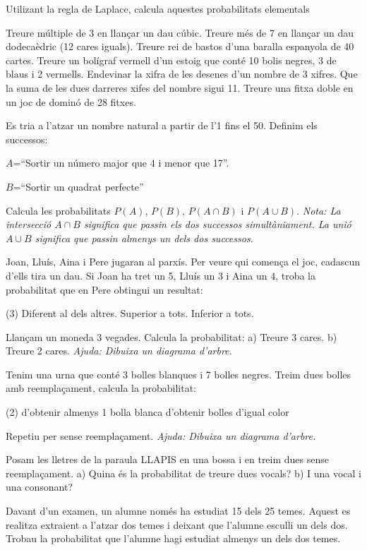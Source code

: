 \documentclass[11pt, a4paper, pdf]{article}
\begin{document}
\begin{mylist}
 
 \item Utilizant la regla de Laplace, calcula aquestes probabilitats elementals
 \begin{tasks}
 	\task Treure múltiple de 3 en llançar un dau cúbic.
 	\task Treure més de 7 en llançar un dau dodecaèdric (12 cares iguals).
 	\task Treure rei de bastos d'una baralla espanyola de 40 cartes.
 	\task Treure un bolígraf vermell d'un estoig que conté 10 bolis negres, 3 de blaus i 2 vermells.
 	\task Endevinar la xifra de les desenes d'un nombre de 3 xifres.
	\task Que la suma de les dues darreres xifes del nombre sigui 11.
 	\task Treure una fitxa doble en un joc de dominó de 28 fitxes.
 \end{tasks}

\item Es tria a l'atzar un nombre natural a partir de l'1 fins el 50. Definim els successos:

\quad $A$=``Sortir un número major que 4 i menor que 17''.

\quad $B$=``Sortir un quadrat perfecte''

Calcula les probabilitats $P(A)$, $P(B)$, $P(A\cap B)$ i $P(A\cup B)$. \textit{Nota:  La intersecció $A\cap B$ significa que passin els dos successos simultàniament. La unió $A\cup B$ significa que passin almenys un dels dos successos.}

\item 
Joan, Lluís, Aina i Pere jugaran al parxís. Per veure qui comença el joc, cadascun
d'ells tira un dau. Si Joan ha tret un 5, Lluís un 3 i Aina un 4, troba la probabilitat que en Pere obtingui un resultat:
\begin{tasks}(3)
\task Diferent al dels altres. \task Superior a tots. \task Inferior a tots.
\end{tasks}

\item Llançam un moneda 3 vegades. Calcula la probabilitat:
	a) Treure 3 cares.
	b) Treure 2 cares.
 \textit{Ajuda: Dibuixa un diagrama d'arbre.}

\item Tenim una urna que conté 3 bolles blanques i 7 bolles negres. Treim dues bolles amb reemplaçament, calcula la probabilitat:
\begin{tasks}(2)
	\task d'obtenir almenys 1 bolla blanca
	\task d'obtenir bolles d'igual color
\end{tasks}
Repetiu per sense reemplaçament. \textit{Ajuda: Dibuixa un diagrama d'arbre.}


\item  Posam les lletres de la paraula LLAPIS en una bossa i en treim dues sense reemplaçament. a) Quina és la probabilitat de treure dues vocals? b) I una vocal i una consonant? 

\item 
Davant d'un examen, un alumne només ha estudiat 15 dels 25 temes. Aquest es realitza extraient a l'atzar dos temes i deixant que l'alumne esculli un dels dos. Trobau la probabilitat que l'alumne hagi estudiat almenys un dels dos temes.
\end{mylist}
 
\end{document}
